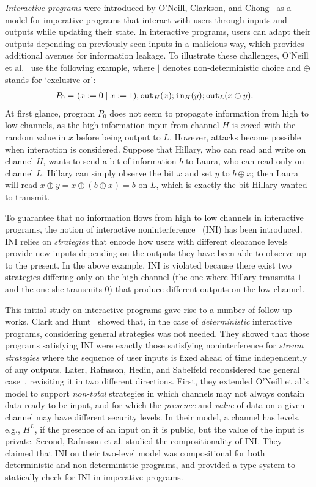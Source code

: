 \documentclass[preprint,5p,twocolumn]{elsarticle}
\begin{document}
\emph{Interactive programs} were introduced by O'Neill, Clarkson, and Chong~\cite{ONeill2006} as a model
for imperative programs that interact with users through inputs and outputs while updating
their state. In interactive programs, users can adapt their outputs depending on previously
seen inputs in a malicious way, which provides additional avenues for information leakage.
To illustrate these challenges, O'Neill et al.~\cite{ONeill2006} use the following
example, where $\mid$ denotes non-deterministic choice and $\oplus$ stands for `exclusive or':
\begin{align*}
  P_0=~&(x := 0 \mid x := 1); \mathtt{out}_{H}(x); \mathtt{in}_{H}(y); \mathtt{out}_{L}(x \oplus y).
\end{align*}
At first glance, program $P_0$ does not seem to propagate information from high to low channels, as
the high information input from channel $H$ is \emph{xor}ed with the random value in $x$ before being
output to $L$. However, attacks become possible when interaction is considered. Suppose that Hillary,
who can read and write on channel $H$, wants to send a bit of information $b$ to Laura, who can read only
on channel $L$. Hillary can simply observe the bit $x$ and set $y$ to $b \oplus x$; then Laura will read
$x \oplus y = x \oplus (b \oplus x) = b$ on $L$, which is exactly the bit Hillary wanted to transmit.

To guarantee that no information flows from high to low channels in interactive programs, the notion
of interactive noninterference~\cite{ONeill2006} (INI) has been introduced. INI relies on \emph{strategies}
that encode how users with different clearance levels provide new inputs depending on the outputs
they have been able to observe up to the present. In the above example, INI is violated because
there exist two strategies differing only on the high channel (the one where Hillary transmits $1$ and the one she transmits $0$) that produce different outputs on the low channel.

This initial study on interactive programs gave rise to a number of follow-up works.
Clark and Hunt~\cite{Clark2008} showed that, in the case of \emph{deterministic} interactive
programs, considering general strategies was not needed. They showed that those programs satisfying INI
were exactly those satisfying noninterference for \emph{stream strategies} where the sequence of user
inputs is fixed ahead of time independently of any outputs. Later, Rafnsson, Hedin, and Sabelfeld
reconsidered the general case~\cite{Rafnsson2012}, revisiting it in two different directions. First, they
extended O'Neill et al.'s model to support \emph{non-total} strategies in which channels may not always
contain data ready to be input, and for which the \emph{presence} and \emph{value} of data on a given channel
may have different security levels. In their model, a channel has levels, e.g., $H^L$, if the
presence of an input on it is public, but the value of the input is private.
Second, Rafnsson et al. studied the compositionality of INI. They claimed that INI on their two-level model
was compositional for both deterministic and non-deterministic programs, and provided a type system to statically
check for INI in imperative programs.
\end{document}
